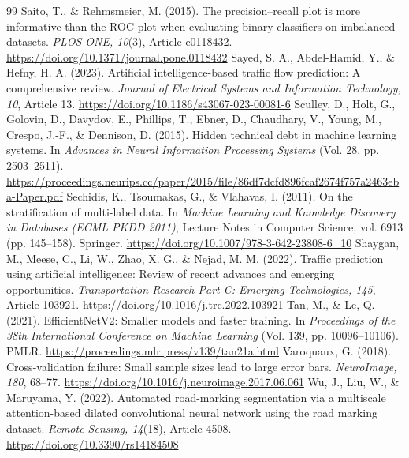 \documentclass[11pt]{article}
\begin{document}
\begin{thebibliography}{99}
 Saito, T., \& Rehmsmeier, M. (2015). The precision--recall plot is more informative than the ROC plot when evaluating binary classifiers on imbalanced datasets. \emph{PLOS ONE, 10}(3), Article e0118432. \url{https://doi.org/10.1371/journal.pone.0118432}
 Sayed, S. A., Abdel-Hamid, Y., \& Hefny, H. A. (2023). Artificial intelligence-based traffic flow prediction: A comprehensive review. \emph{Journal of Electrical Systems and Information Technology, 10}, Article 13. \url{https://doi.org/10.1186/s43067-023-00081-6}
 Sculley, D., Holt, G., Golovin, D., Davydov, E., Phillips, T., Ebner, D., Chaudhary, V., Young, M., Crespo, J.-F., \& Dennison, D. (2015). Hidden technical debt in machine learning systems. In \emph{Advances in Neural Information Processing Systems} (Vol. 28, pp. 2503--2511). \url{https://proceedings.neurips.cc/paper/2015/file/86df7dcfd896fcaf2674f757a2463eba-Paper.pdf}
 Sechidis, K., Tsoumakas, G., \& Vlahavas, I. (2011). On the stratification of multi-label data. In \emph{Machine Learning and Knowledge Discovery in Databases (ECML PKDD 2011)}, Lecture Notes in Computer Science, vol. 6913 (pp. 145--158). Springer. \url{https://doi.org/10.1007/978-3-642-23808-6_10}
 Shaygan, M., Meese, C., Li, W., Zhao, X. G., \& Nejad, M. M. (2022). Traffic prediction using artificial intelligence: Review of recent advances and emerging opportunities. \emph{Transportation Research Part C: Emerging Technologies, 145}, Article 103921. \url{https://doi.org/10.1016/j.trc.2022.103921}
 Tan, M., \& Le, Q. (2021). EfficientNetV2: Smaller models and faster training. In \emph{Proceedings of the 38th International Conference on Machine Learning} (Vol. 139, pp. 10096--10106). PMLR. \url{https://proceedings.mlr.press/v139/tan21a.html}
 Varoquaux, G. (2018). Cross-validation failure: Small sample sizes lead to large error bars. \emph{NeuroImage, 180}, 68--77. \url{https://doi.org/10.1016/j.neuroimage.2017.06.061}
 Wu, J., Liu, W., \& Maruyama, Y. (2022). Automated road-marking segmentation via a multiscale attention-based dilated convolutional neural network using the road marking dataset. \emph{Remote Sensing, 14}(18), Article 4508. \url{https://doi.org/10.3390/rs14184508}
\end{thebibliography}
\end{document}
